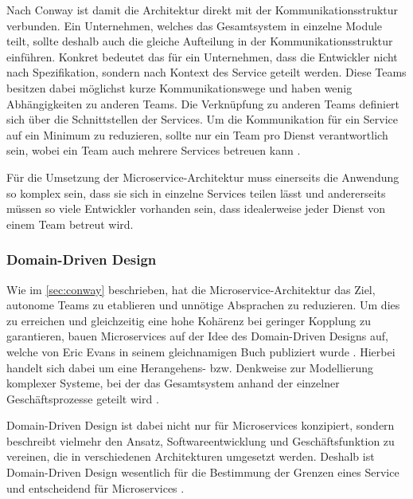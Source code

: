 Nach Conway ist damit die Architektur direkt mit der Kommunikationsstruktur verbunden. Ein Unternehmen, welches das Gesamtsystem in einzelne Module teilt, sollte deshalb auch die gleiche Aufteilung in der Kommunikationsstruktur einführen. Konkret bedeutet das für ein Unternehmen, dass die Entwickler nicht nach Spezifikation, sondern nach Kontext des Service geteilt werden. Diese Teams besitzen dabei möglichst kurze Kommunikationswege und haben wenig Abhängigkeiten zu anderen Teams. Die Verknüpfung zu anderen Teams definiert sich über die Schnittstellen der Services.
Um die Kommunikation für ein Service auf ein Minimum zu reduzieren, sollte nur ein Team pro Dienst verantwortlich sein, wobei ein Team auch mehrere Services betreuen kann \parencite[vgl.][Kap. 4.2]{wolff_microservices_2018}. 

Für die Umsetzung der Microservice-Architektur muss einerseits die Anwendung so komplex sein, dass sie sich in einzelne Services teilen lässt und andererseits müssen so viele Entwickler vorhanden sein, dass idealerweise jeder Dienst von einem Team betreut wird.

\subsubsection{Domain-Driven Design}
\label{sec:ddd}

Wie im \cref{sec:conway} beschrieben, hat die Microservice-Architektur das Ziel, autonome Teams zu etablieren und unnötige Absprachen zu reduzieren. Um dies zu erreichen und gleichzeitig eine hohe Kohärenz bei geringer Kopplung zu garantieren, bauen Microservices auf der Idee des Domain-Driven Designs auf, welche von Eric Evans in seinem gleichnamigen Buch publiziert wurde \parencite[vgl.][Kap. 2.4]{newman_monolith_2019}. Hierbei handelt sich dabei um eine Herangehens- bzw. Denkweise zur Modellierung komplexer Systeme, bei der das Gesamtsystem anhand der einzelner Geschäftsprozesse geteilt wird \parencite[vgl.][S. xix ff.]{evans_domain-driven_2003}.

Domain-Driven Design ist dabei nicht nur für Microservices konzipiert, sondern beschreibt vielmehr den Ansatz, Softwareentwicklung und Geschäftsfunktion zu vereinen, die in verschiedenen Architekturen umgesetzt werden. Deshalb ist Domain-Driven Design wesentlich für die Bestimmung der Grenzen eines Service und entscheidend für Microservices \parencite[vgl.][Kap. 4.3]{wolff_microservices_2018}.

